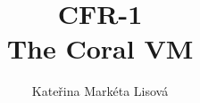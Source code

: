 \documentclass[12pt,a4paper,twoside,titlepage]{book}
\begin{document}
\frontmatter
\title{CFR-1\\ \large The Coral VM}
\renewcommand{\docversion}{0.1-alpha1}
\author{Kateřina Markéta Lisová}
\maketitle
\clearemptydoublepage
\tableofcontents

\mainmatter
\sloppy



\appendix
\end{document}
